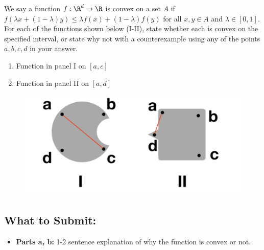 \documentclass{article}
\begin{document}
\begin{aprob}
     We say a function $f: \R^d \rightarrow \R$ is convex on a set $A$ if $f(\lambda x + (1-\lambda) y) \leq \lambda f(x) + (1-\lambda) f(y)$ for all $x,y\in A$ and $\lambda \in [0,1]$. For each of the functions shown below (I-II), state whether each is convex on the specified interval, or state why not with a counterexample using any of the points $a,b,c,d$ in your answer.

    \begin{enumerate}
        \item Function in panel I on $[a,c]$
        \item Function in panel II on $[a,d]$
    \end{enumerate}
    
    \begin{figure}[!h]
        \centering
        \includegraphics[width=.75\textwidth]{../img/convex_functions2.png}
    \end{figure}

    \subsection*{What to Submit:}
    \begin{itemize}
        \item \textbf{Parts a, b:} 1-2 sentence explanation of why the function is convex or not.
    \end{itemize}
\end{aprob}
\end{document}

